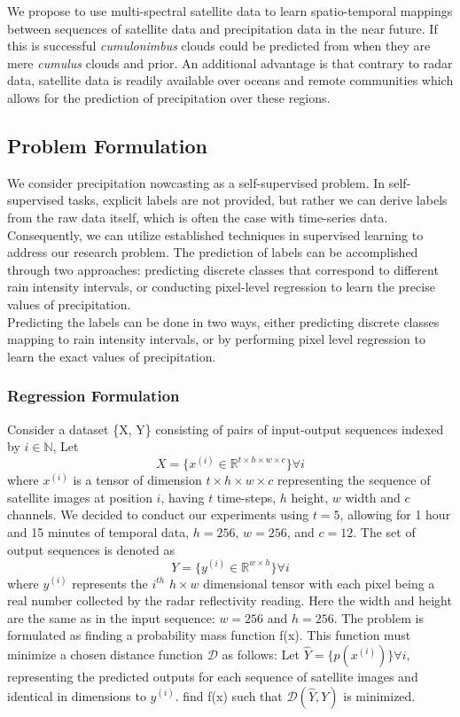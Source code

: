 We propose to use multi-spectral satellite data to learn spatio-temporal mappings between sequences of satellite data and precipitation data in the near future. If this is successful \textit{cumulonimbus} clouds could be predicted from when they are mere \textit{cumulus} clouds and prior. An additional advantage is that contrary to radar data, satellite data is readily available over oceans and remote communities which allows for the prediction of precipitation over these regions.
\smallskip

\subsection{Problem Formulation}
We consider precipitation nowcasting as a self-supervised problem. In self-supervised tasks, explicit labels are not provided, but rather we can derive labels from the raw data itself, which is often the case with time-series data. Consequently, we can utilize established techniques in supervised learning to address our research problem. The prediction of labels can be accomplished through two approaches: predicting discrete classes that correspond to different rain intensity intervals, or conducting pixel-level regression to learn the precise values of precipitation.
\\
Predicting the labels can be done in two ways, either predicting discrete classes mapping to rain intensity intervals, or by performing pixel level regression to learn the exact values of precipitation.

\subsubsection{Regression Formulation} Consider a dataset \{X, Y\} consisting of pairs of input-output sequences indexed by $i \in \mathbb{N}$,
Let $$X = \{x^{(i)} \in \mathbb{R}^{t \times h \times w \times c}\} \forall i$$ 
where $x^{(i)}$ is a tensor of dimension $t \times h \times w \times c$ representing the sequence of satellite images at position $i$, having $t$ time-steps, $h$ height, $w$ width and $c$ channels.
We decided to conduct our experiments using $t = 5$, allowing for 1 hour and 15 minutes of temporal data, $h = 256$, $w = 256$, and $c = 12$.
The set of output sequences is denoted as $$Y = \{y^{(i)} \in \mathbb{R}^{w\times h}\}\forall i$$
where $y^{(i)}$ represents the $i^{th}$ $h \times w$ dimensional tensor with each pixel being a real number collected by the radar reflectivity reading.
Here the width and height are the same as in the input sequence: $w = 256$ and $h = 256$.
The problem is formulated as finding a probability mass function f(x). This function must minimize a chosen distance function $\mathcal{D}$ as follows:
Let $\hat{Y} = \{p(x^{(i)})\}\forall i$, representing the predicted outputs for each sequence of satellite images and identical in dimensions to $y^{(i)}$.
find f(x) such that $\mathcal{D}(\hat{Y}, Y)$ is minimized.

